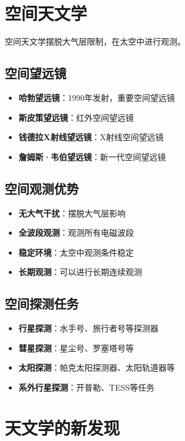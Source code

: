 \documentclass[12pt,UTF8]{ctexbook}
\begin{document}
\section{空间天文学}

空间天文学摆脱大气层限制，在太空中进行观测。

\subsection{空间望远镜}

\begin{itemize}
  \item \textbf{哈勃望远镜}：1990年发射，重要空间望远镜
  \item \textbf{斯皮策望远镜}：红外空间望远镜
  \item \textbf{钱德拉X射线望远镜}：X射线空间望远镜
  \item \textbf{詹姆斯·韦伯望远镜}：新一代空间望远镜
\end{itemize}

\subsection{空间观测优势}

\begin{itemize}
  \item \textbf{无大气干扰}：摆脱大气层影响
  \item \textbf{全波段观测}：观测所有电磁波段
  \item \textbf{稳定环境}：太空中观测条件稳定
  \item \textbf{长期观测}：可以进行长期连续观测
\end{itemize}

\subsection{空间探测任务}

\begin{itemize}
  \item \textbf{行星探测}：水手号、旅行者号等探测器
  \item \textbf{彗星探测}：星尘号、罗塞塔号等
  \item \textbf{太阳探测}：帕克太阳探测器、太阳轨道器等
  \item \textbf{系外行星探测}：开普勒、TESS等任务
\end{itemize}

\section{天文学的新发现}
\end{document}
